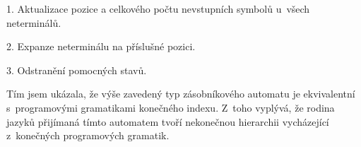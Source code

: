 \begin{list}{}{\setlength\parsep{0cm} \setlength\itemsep{0cm} \setlength\leftmargin{1em}}
\item 1. Aktualizace pozice a celkového počtu nevstupních symbolů u~všech neterminálů.
\item 2. Expanze neterminálu na příslušné pozici.
\item 3. Odstranění pomocných stavů.
\end{list}

Tím jsem ukázala, že výše zavedený typ zásobníkového automatu je ekvivalentní s~programovými gramatikami konečného indexu. Z~toho vyplývá, že rodina jazyků přijímaná tímto automatem tvoří nekonečnou hierarchii vycházející z~konečných programových gramatik.


